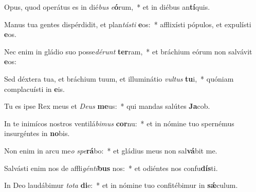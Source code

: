\item Opus, quod operátus es in dié\textit{bus} \textit{e}\textbf{ó}rum,~* et in diébus an\textbf{tí}quis.
\item Manus tua gentes dispérdidit, et plan\textit{tás}\textit{ti} \textbf{e}os:~* afflixísti pópulos, et expulísti \textbf{e}os.
\item Nec enim in gládio suo posse\textit{dé}\textit{runt} \textbf{ter}ram,~* et bráchium eórum non salvávit \textbf{e}os:
\item Sed déxtera tua, et bráchium tuum, et illuminátio \textit{vul}\textit{tus} \textbf{tu}i,~* quóniam complacuísti in \textbf{e}is.
\item Tu es ipse Rex meus et \textit{De}\textit{us} \textbf{me}us:~* qui mandas salútes \textbf{Ja}cob.
\item In te inimícos nostros ventilá\textit{bi}\textit{mus} \textbf{cor}nu:~* et in nómine tuo spernémus insurgéntes in \textbf{no}bis.
\item Non enim in arcu me\textit{o} \textit{spe}\textbf{rá}bo:~* et gládius meus non sal\textbf{vá}bit me.
\item Salvásti enim nos de affli\textit{gén}\textit{ti}\textbf{bus} nos:~* et odiéntes nos confu\textbf{dís}ti.
\item In Deo laudábimur \textit{to}\textit{ta} \textbf{di}e:~* et in nómine tuo confitébimur in \textbf{sǽ}culum.

